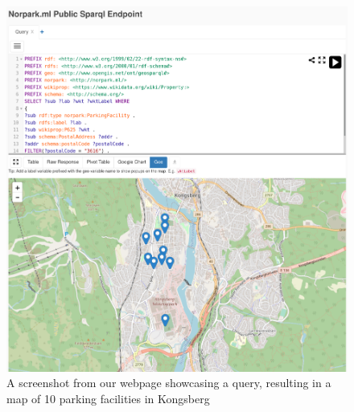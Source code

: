 \begin{figure}[H]
	\centering
	\includegraphics[width=\linewidth]{figures/query-screenshot.png}
	\caption{A screenshot from our webpage showcasing a query, resulting in a map of 10 parking facilities in Kongsberg}
\end{figure}


